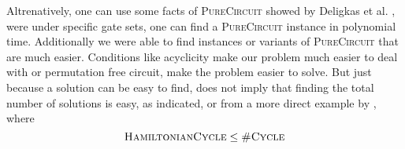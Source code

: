 Altrenatively, one can use some facts of \textsc{PureCircuit} showed by Deligkas et al.
\cite{deligkasPureCircuitTightInapproximability2024}, were under specific 
gate sets, one can find a \textsc{PureCircuit} instance in polynomial time.
Additionally we were able to find instances or variants of \textsc{PureCircuit}
that are much easier. Conditions like acyclicity make our problem much easier to deal with
or permutation free circuit, make the problem easier to solve.
But just because a solution can be easy to find, does not imply that finding the total number of solutions
is easy, as \cite{valiantComplexityComputingPermanent1979} indicated, or from a more direct
example by \cite{aroraComputationalComplexityModern2009}, where
$$
\textsc{HamiltonianCycle} \leq \textsc{\#Cycle}
$$





